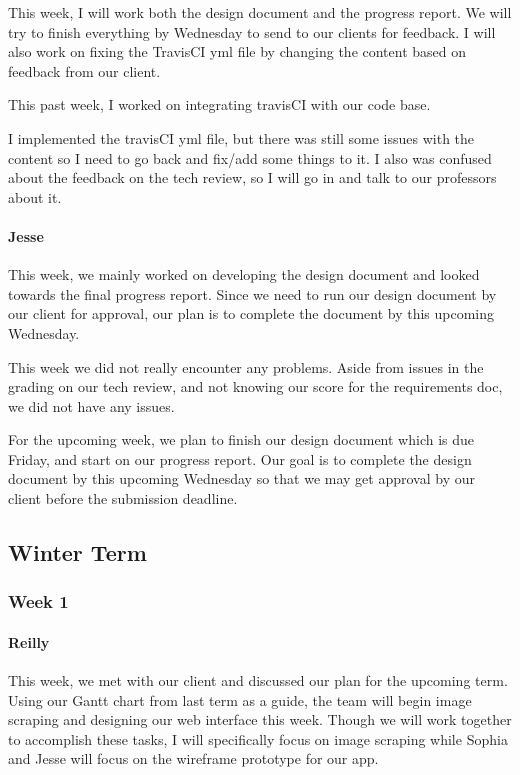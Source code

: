 \documentclass[onecolumn, draftclsnofoot,10pt, compsoc]{IEEEtran}
\begin{document}
\begin{flushleft}
This week, I will work both the design document and the progress report. We will try to finish everything by Wednesday to send to our clients for feedback. I will also work on fixing the TravisCI yml file by changing the content based on feedback from our client.
 
 
This past week, I worked on integrating travisCI with our code base.
 
 
I implemented the travisCI yml file, but there was still some issues with the content so I need to go back and fix/add some things to it. I also was confused about the feedback on the tech review, so I will go in and talk to our professors about it.
 
\paragraph{Jesse}
 
This week, we mainly worked on developing the design document and looked towards the final progress report. Since we need to run our design document by our client for approval, our plan is to complete the document by this upcoming Wednesday.
 
 
This week we did not really encounter any problems. Aside from issues in the grading on our tech review, and not knowing our score for the requirements doc, we did not have any issues.
 
 
For the upcoming week, we plan to finish our design document which is due Friday, and start on our progress report. Our goal is to complete the design document by this upcoming Wednesday so that we may get approval by our client before the submission deadline.
 
\subsection{Winter Term}
\subsubsection{Week 1}
\paragraph{Reilly}
 
This week, we met with our client and discussed our plan for the upcoming term. Using our Gantt chart from last term as a guide, the team will begin image scraping and designing our web interface this week. Though we will work together to accomplish these tasks, I will specifically focus on image scraping while Sophia and Jesse will focus on the wireframe prototype for our app.
 

\end{flushleft}
\end{document}
